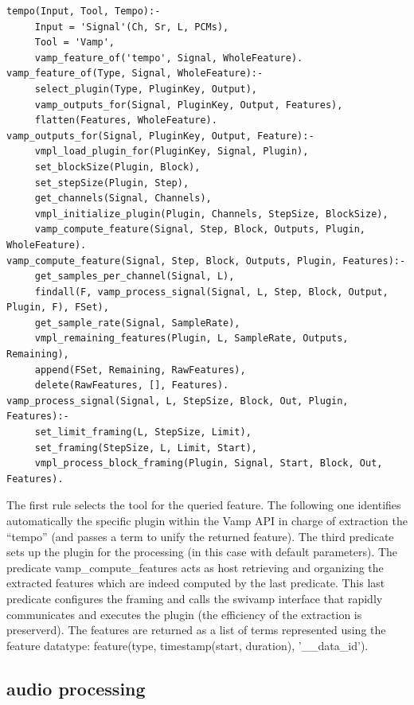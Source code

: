 \documentclass[runningheads]{llncs}
\begin{document}
\medskip
\noindent
\begin{verbatim}
tempo(Input, Tool, Tempo):-
     Input = 'Signal'(Ch, Sr, L, PCMs),
     Tool = 'Vamp',
     vamp_feature_of('tempo', Signal, WholeFeature).
vamp_feature_of(Type, Signal, WholeFeature):-
     select_plugin(Type, PluginKey, Output),
     vamp_outputs_for(Signal, PluginKey, Output, Features),
     flatten(Features, WholeFeature).
vamp_outputs_for(Signal, PluginKey, Output, Feature):-
     vmpl_load_plugin_for(PluginKey, Signal, Plugin),
     set_blockSize(Plugin, Block),
     set_stepSize(Plugin, Step),
     get_channels(Signal, Channels),
     vmpl_initialize_plugin(Plugin, Channels, StepSize, BlockSize),
     vamp_compute_feature(Signal, Step, Block, Outputs, Plugin, WholeFeature).
vamp_compute_feature(Signal, Step, Block, Outputs, Plugin, Features):-
     get_samples_per_channel(Signal, L),
     findall(F, vamp_process_signal(Signal, L, Step, Block, Output, Plugin, F), FSet),
     get_sample_rate(Signal, SampleRate),
     vmpl_remaining_features(Plugin, L, SampleRate, Outputs, Remaining),
     append(FSet, Remaining, RawFeatures),
     delete(RawFeatures, [], Features).
vamp_process_signal(Signal, L, StepSize, Block, Out, Plugin, Features):-
     set_limit_framing(L, StepSize, Limit),
     set_framing(StepSize, L, Limit, Start),
     vmpl_process_block_framing(Plugin, Signal, Start, Block, Out, Features).

\end{verbatim}
\noindent

The first rule selects the tool for the queried feature. The following one identifies automatically the specific plugin within the Vamp API in charge of extraction the ``tempo'' (and passes a term to unify the returned feature). The third predicate sets up the plugin for the processing (in this case with default parameters). The predicate vamp\_compute\_features acts as host retrieving and organizing the extracted features which are indeed computed by the last predicate. This last predicate configures the framing and calls the swivamp interface that rapidly communicates and executes the plugin (the efficiency of the extraction is preserverd). The features are returned as a list of terms represented using the feature datatype: feature(type, timestamp(start, duration), '\_\_data\_id').

\subsection{audio processing}\label{subsec:swilasdpa}
\end{document}

